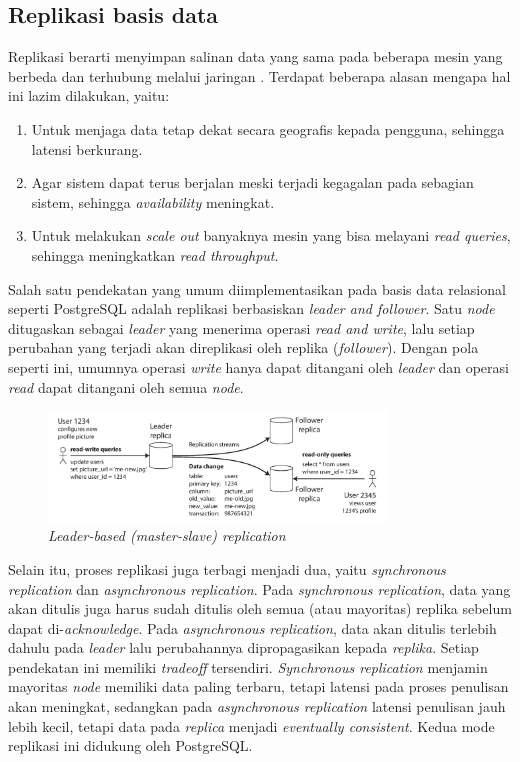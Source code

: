 \subsection{Replikasi basis data}

Replikasi berarti menyimpan salinan data yang sama pada beberapa mesin yang berbeda dan terhubung melalui jaringan \parencite{dataIntensiveApplications}. Terdapat beberapa alasan mengapa hal ini lazim dilakukan, yaitu:

\begin{enumerate}
    \item Untuk menjaga data tetap dekat secara geografis kepada pengguna, sehingga latensi berkurang.
    \item Agar sistem dapat terus berjalan meski terjadi kegagalan pada sebagian sistem, sehingga \textit{availability} meningkat.
    \item Untuk melakukan \textit{scale out} banyaknya mesin yang bisa melayani \textit{read queries}, sehingga meningkatkan \textit{read throughput}.
\end{enumerate}

Salah satu pendekatan yang umum diimplementasikan pada basis data relasional seperti PostgreSQL adalah replikasi berbasiskan \textit{leader and follower}. Satu \textit{node} ditugaskan sebagai \textit{leader} yang menerima operasi \textit{read and write}, lalu setiap perubahan yang terjadi akan direplikasi oleh replika (\textit{follower}). Dengan pola seperti ini, umumnya operasi \textit{write} hanya dapat ditangani oleh \textit{leader} dan operasi \textit{read} dapat ditangani oleh semua \textit{node}.

\begin{figure}
    \centering
    \includegraphics[width=0.8\textwidth]{resources/chapter-2/leader-based-replication.png}
    \caption{\textit{Leader-based (master-slave) replication \parencite{dataIntensiveApplications}}}
    \label{fig:leader-based-replication}
\end{figure}

Selain itu, proses replikasi juga terbagi menjadi dua, yaitu \textit{synchronous replication} dan \textit{asynchronous replication}. Pada \textit{synchronous replication}, data yang akan ditulis juga harus sudah ditulis oleh semua (atau mayoritas) replika sebelum dapat di-\textit{acknowledge}. Pada \textit{asynchronous replication}, data akan ditulis terlebih dahulu pada \textit{leader} lalu perubahannya dipropagasikan kepada \textit{replika}. Setiap pendekatan ini memiliki \textit{tradeoff} tersendiri. \textit{Synchronous replication} menjamin mayoritas \textit{node} memiliki data paling terbaru, tetapi latensi pada proses penulisan akan meningkat, sedangkan pada \textit{asynchronous replication} latensi penulisan jauh lebih kecil, tetapi data pada \textit{replica} menjadi \textit{eventually consistent}. Kedua mode replikasi ini didukung oleh PostgreSQL.